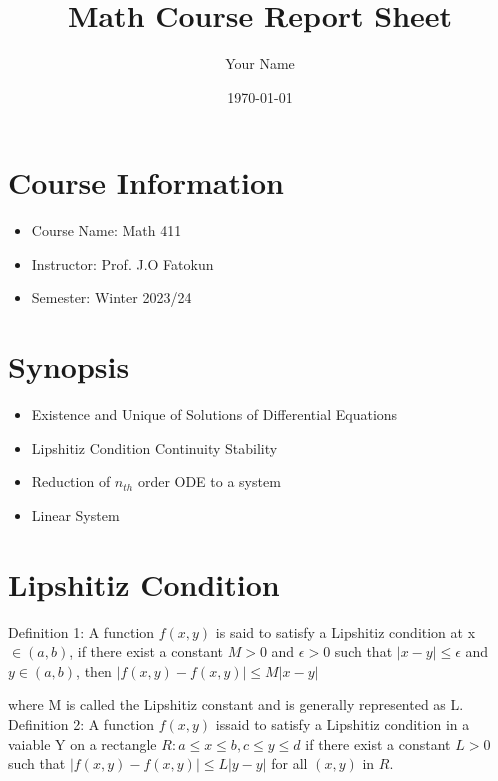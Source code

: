 \documentclass{article}
\begin{document}
\title{Math Course Report Sheet}
\author{Your Name}
\date{\today}

\maketitle

\section*{Course Information}

\begin{itemize}
    \item Course Name: Math 411
    \item Instructor: Prof. J.O Fatokun
    \item Semester: Winter 2023/24
\end{itemize}

\section*{Synopsis}
\begin{itemize}
    \item Existence and Unique of Solutions of Differential Equations
    \item Lipshitiz Condition
    \subitem Continuity
    \subitem Stability

    \item Reduction of $n_{th}$ order ODE to a system
    \item Linear System
\end{itemize}


\newpage

\section{Lipshitiz Condition}

Definition 1: A function $f(x,y)$ is said to satisfy a Lipshitiz condition at x $\in(a,b)$, if there exist a constant $M>0$ and $\epsilon >0$ such that $|x-y| \leq \epsilon$ and $y \in (a,b)$, then $|f(x,y)-f(x,y)| \leq M|x-y|$

where M is called the Lipshitiz constant and is generally represented as L.
\newline
Definition 2: A function $f(x,y)$ issaid to satisfy a Lipshitiz condition in a vaiable Y on a rectangle $R: a \leq x \leq b, c \leq y \leq d$ if there exist a constant $L>0$ such that $|f(x,y)-f(x,y)| \leq L|y-y|$ for all $(x,y)$ in $R$.
\end{document}
